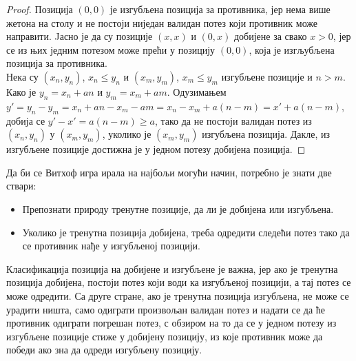 \documentclass[a4paper]{article}
\begin{document}
\begin{proof}
	Позиција $ (0, 0) $ је изгубљена позиција за противника, јер нема више жетона на столу и не постоји ниједан валидан потез који противник може направити. Jасно је да су позиције $ (x, x) $ и $ (0, x) $ добијене за свако $ x > 0 $,  јер се из њих једним потезом може прећи у позицију $ (0, 0) $, која је изгљубљена позиција за противника.\\
	Нека су $ (x_{n}, y_{n}) $, $ x_{n} \le y_{n} $ и $ (x_{m}, y_{m}) $, $ x_{m} \le y_{m} $ изгубљене позиције и $ n > m $. Како је $ y_{n} = x_{n} + an $ и $ y_{m} = x_{m} + am $. Одузимањем $ y' = y_{n} - y_{m} = x_{n} + an - x_{m} - am = x_{n} - x_{m} + a(n - m) = x' + a(n - m) $, добија се $ y' - x' = a(n - m) \ge a $, тако да не постоји валидан потез из $ (x_{n}, y_{n}) $ у $ (x_{m}, y_{m}) $, уколико је $ (x_{m}, y_{m}) $ изгубљена позиција.
	Дакле, из изгубљене позиције достижна је у једном потезу добијена позиција.
\end{proof}

Да би се Витхоф игра ирала на најбољи могући начин, потребно је знати две ствари:
\begin{itemize}
	\item Препознати природу тренутне позиције, да ли је добијена или изгубљена.
	\item Уколико је тренутна позиција добијена, треба одредити следећи потез тако да се противник нађе у изгубљеној позицији.
\end{itemize}

Класификација позиција на добијене и изгубљене је важна, јер ако је тренутна позиција добијена, постоји потез који води ка изгубљеној позицији, а тај потез се може одредити. Са друге стране, ако је тренутна позиција изгубљена, не може се урадити ништа, само одиграти произвољан валидан потез и надати се да ће противник одиграти погрешан потез, с обзиром на то да се у једном потезу из изгубљене позиције стиже у добијену позицију, из које противник може да победи ако зна да одреди изгубљену позицију. 
\end{document}
